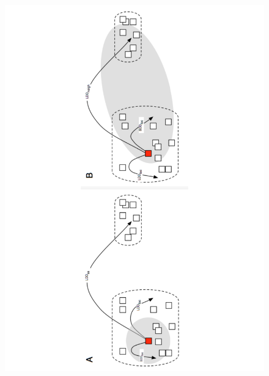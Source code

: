 \documentclass[a4paper, 12pt]{article}
\begin{document}
\begin{linenumbers}
\newpage 
\pagestyle{empty}
\begin{figure}[htbp]
\centerline{\includegraphics[height=25cm]{Fig2.pdf}}
%
\end{figure}


\end{linenumbers}
\end{document}
